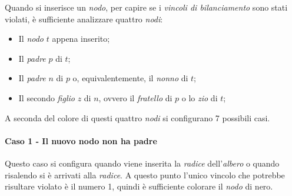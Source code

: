 \medskip\noindent
\begin{minipage}[c]{0.6\textwidth}
Quando si inserisce un \emph{nodo}, per capire se i \emph{vincoli di bilanciamento}
sono stati violati, è sufficiente analizzare quattro \emph{nodi}:
\begin{itemize}
    \item Il \emph{nodo} $t$ appena inserito;
    \item Il \emph{padre} $p$ di $t$;
    \item Il \emph{padre} $n$ di $p$ o, equivalentemente, il \emph{nonno} di $t$;
    \item Il secondo \emph{figlio} $z$ di $n$, ovvero il \emph{fratello} di $p$ o
    lo \emph{zio} di $t$;
\end{itemize}
\end{minipage}
\hfill
\begin{minipage}[c]{0.38\textwidth}
\begin{center}
\end{center}
\end{minipage}

\medskip\noindent
A seconda del colore di questi quattro \emph{nodi} si configurano 7 possibili
casi.

\paragraph{Caso 1 - Il nuovo nodo non ha padre}
Questo caso si configura quando viene inserita la \emph{radice} dell'\emph{albero}
o quando risalendo si è arrivati alla \emph{radice}. A questo punto l'unico
vincolo che potrebbe risultare violato è il numero 1, quindi è sufficiente
colorare il \emph{nodo} di nero.

